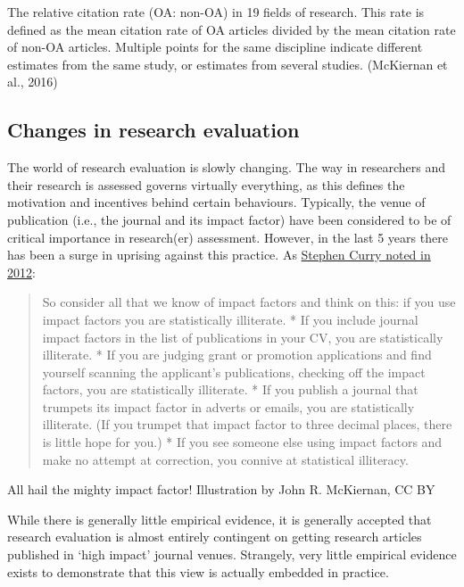 \documentclass[]{book}
\begin{document}
The relative citation rate (OA: non-OA) in 19 fields of research. This rate is defined as the mean citation rate of OA articles divided by the mean citation rate of non-OA articles. Multiple points for the same discipline indicate different estimates from the same study, or estimates from several studies. (McKiernan et al., 2016)

\hypertarget{changes-in-research-evaluation}{%
\subsection{Changes in research evaluation }\label{changes-in-research-evaluation}}

The world of research evaluation is slowly changing. The way in researchers and their research is assessed governs virtually everything, as this defines the motivation and incentives behind certain behaviours. Typically, the venue of publication (i.e., the journal and its impact factor) have been considered to be of critical importance in research(er) assessment. However, in the last 5 years there has been a surge in uprising against this practice. As \href{http://occamstypewriter.org/scurry/2012/08/13/sick-of-impact-factors/}{Stephen Curry noted in 2012}:

\begin{quote}
So consider all that we know of impact factors and think on this: if you use impact factors you are statistically illiterate.
* If you include journal impact factors in the list of publications in your CV, you are statistically illiterate.
* If you are judging grant or promotion applications and find yourself scanning the applicant's publications, checking off the impact factors, you are statistically illiterate.
* If you publish a journal that trumpets its impact factor in adverts or emails, you are statistically illiterate. (If you trumpet that impact factor to three decimal places, there is little hope for you.)
* If you see someone else using impact factors and make no attempt at correction, you connive at statistical illiteracy.
\end{quote}

All hail the mighty impact factor! Illustration by John R. McKiernan, CC BY

While there is generally little empirical evidence, it is generally accepted that research evaluation is almost entirely contingent on getting research articles published in `high impact' journal venues. Strangely, very little empirical evidence exists to demonstrate that this view is actually embedded in practice.
\end{document}
